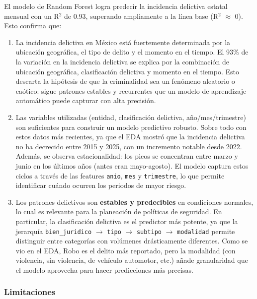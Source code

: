 El modelo de Random Forest logra predecir la incidencia delictiva estatal mensual con un R$^2$ de 0.93, superando
ampliamente a la línea base (R$^2$ $\approx$ 0). Esto confirma que:

\begin{enumerate}
  \item La incidencia delictiva en México está fuertemente determinada por la ubicación geográfica, el tipo de
  delito y el momento en el tiempo. El 93\% de la variación en la incidencia delictiva se explica por la
  combinación de ubicación geográfica, clasificación delictiva y momento en el tiempo. Esto descarta la
  hipótesis de que la criminalidad sea un fenómeno aleatorio o caótico: sigue patrones estables y recurrentes
  que un modelo de aprendizaje automático puede capturar con alta precisión.

  \item Las variables utilizadas (entidad, clasificación delictiva, año/mes/trimestre) son suficientes para
  construir un modelo predictivo robusto. Sobre todo con estos datos más recientes, ya que el EDA mostró que
  la incidencia delictiva no ha decrecido entre 2015 y 2025, con un incremento notable desde 2022. Además,
  se observa estacionalidad: los picos se concentran entre marzo y junio en los últimos años (antes eran
  mayo-agosto). El modelo captura estos ciclos a través de las features \texttt{anio}, \texttt{mes} y \texttt{trimestre}, lo
  que permite identificar cuándo ocurren los periodos de mayor riesgo.

  \item Los patrones delictivos son \textbf{estables y predecibles} en condiciones normales, lo cual es relevante
  para la planeación de políticas de seguridad. En particular, la clasificación delictiva es el predictor
  más potente, ya que la jerarquía \texttt{bien\_juridico} $\rightarrow$ \texttt{tipo} $\rightarrow$ \texttt{subtipo} $\rightarrow$ \texttt{modalidad} permite distinguir entre
  categorías con volúmenes drásticamente diferentes. Como se vio en el EDA, Robo es el delito más reportado,
  pero la modalidad (con violencia, sin violencia, de vehículo automotor, etc.) añade granularidad que el
  modelo aprovecha para hacer predicciones más precisas.
\end{enumerate}

\subsubsection{Limitaciones}

